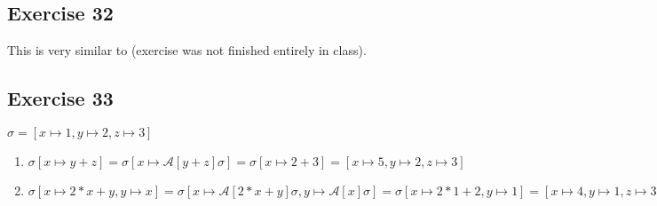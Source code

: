 \documentclass[12pt,fleqn]{article}		%
\begin{document}
\subsection{Exercise 32}
This is very similar to  (exercise was not finished entirely in class).

\subsection{Exercise 33}
$ \sigma = [x \mapsto 1, y \mapsto 2, z \mapsto 3] $
\begin{enumerate}
\item $ \sigma[x \mapsto y+z] = \sigma[x \mapsto \mathcal{A}[y+z]\sigma] = \sigma[x \mapsto 2+3] = [x \mapsto 5, y \mapsto 2, z \mapsto 3] $
\item $ \sigma[x \mapsto 2*x+y, y \mapsto x] = \sigma[x \mapsto \mathcal{A}[2*x+y]\sigma, y \mapsto \mathcal{A}[x]\sigma] = \sigma[x \mapsto 2*1+2, y \mapsto 1] = [x \mapsto 4, y \mapsto 1, z \mapsto 3] $
\end{enumerate}
\end{document}
